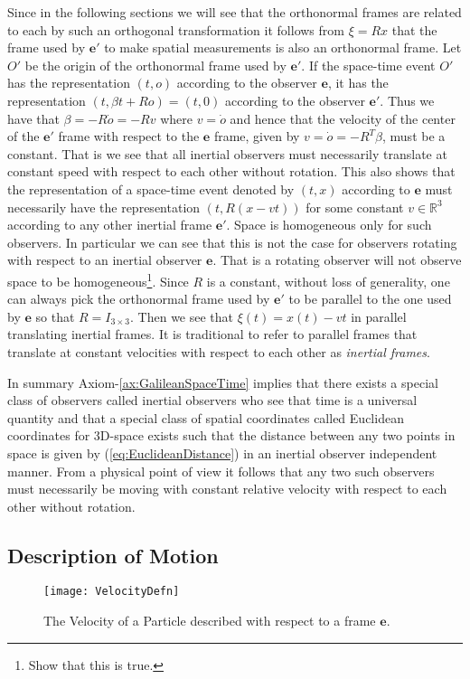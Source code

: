\documentclass[graybox,envcountchap,sectrefs]{svmonoMuga}
\begin{document}
Since in the following sections we will see that the orthonormal frames are related to each by such an orthogonal transformation it follows from $\xi=Rx$ that the frame used by $\mathbf{e}'$ to make spatial measurements is also an orthonormal frame.
Let $O'$ be the origin of the orthonormal frame used by $\mathbf{e}'$. If the space-time event $O'$ has the representation $(t,o)$ according to the observer $\mathbf{e}$, it has the representation $(t,\beta t+ Ro)=(t,0)$ according to the observer $\mathbf{e}'$. Thus we have that $\beta=-R\dot{o}=-Rv$ where $v=\dot{o}$ and hence that the velocity of the center of the $\mathbf{e}'$ frame with respect to the $\mathbf{e}$ frame, given by $v=\dot{o}=-R^T\beta$, must be a constant. That is we see that all inertial observers must necessarily translate at constant speed with respect to each other without rotation.
This also shows that the representation of a space-time event denoted by $(t,x)$ according to $\mathbf{e}$ must necessarily have the representation $\left(t,R(x-vt)\right)$ for some constant $v\in \mathbb{R}^3$ according to any other inertial frame $\mathbf{e}'$. Space is homogeneous only for such observers. In particular we can see that this is not the case for observers rotating with respect to an inertial observer $\mathbf{e}$. That is a rotating observer will not observe space to be homogeneous\footnote{Show that this is true.}. Since $R$ is a constant, without loss of generality, one can always pick the orthonormal frame used by $\mathbf{e}'$ to be parallel to the one used by $\mathbf{e}$ so that $R=I_{3\times 3}$. Then we see that $\xi(t)=x(t)-vt$ in parallel translating inertial frames. It is traditional to refer to parallel frames that translate at constant velocities with respect to each other as \textit{inertial frames}.
\begin{svgraybox}
In summary Axiom-\ref{ax:GalileanSpaceTime} implies that there exists a special class of observers called inertial observers who see that time is a universal quantity and that a special class of spatial coordinates called Euclidean coordinates for 3D-space exists such that the distance between any two points in space is given by (\ref{eq:EuclideanDistance}) in an inertial observer independent manner. From a physical point of view it follows that any two such observers must necessarily be moving with constant relative velocity with respect to each other without rotation.
\end{svgraybox}

\subsection{Description of Motion}
\begin{figure}[ht]
\begin{center}
\texttt{[image: VelocityDefn]}
\renewcommand{\baselinestretch}{1}\selectfont
\caption{The Velocity of a Particle described with respect to a frame $\mathbf{e}$.}
\label{Fig:VelocityDefn}
\renewcommand{\baselinestretch}{1.5}\selectfont
\end{center}
\end{figure}
\end{document}
